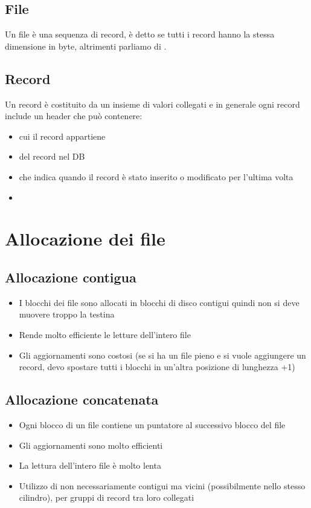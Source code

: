 \documentclass[12pt, a4paper]{report}
\begin{document}
    \subsection{File}
    Un file è una sequenza di record, è detto  se tutti i record hanno la stessa dimensione in byte, altrimenti parliamo di .
    \subsection{Record}
    Un record è costituito da un insieme di valori collegati e in generale ogni record include un header che può contenere:
    \begin{itemize}
        \item {} cui il record appartiene
        \item {} del record nel DB
        \item {} che indica quando il record è stato inserito o modificato per l'ultima volta
        \item {}
    \end{itemize}
    \section{Allocazione dei file}
    \subsection{Allocazione contigua}
    \begin{itemize}
        \item I blocchi dei file sono allocati in blocchi di disco contigui quindi non si deve muovere troppo la testina
        \item Rende molto efficiente le letture dell'intero file
        \item Gli aggiornamenti sono costosi (se si ha un file pieno e si vuole aggiungere un record, devo spostare tutti i blocchi in un'altra posizione di lunghezza +1)
    \end{itemize}
    \subsection{Allocazione concatenata}
    \begin{itemize}
        \item Ogni blocco di un file contiene un puntatore al successivo blocco del file
        \item Gli aggiornamenti sono molto efficienti
        \item La lettura dell'intero file è molto lenta
        \item Utilizzo di  non necessariamente contigui ma vicini (possibilmente nello stesso cilindro), per gruppi di record tra loro collegati
    \end{itemize}
\end{document}
